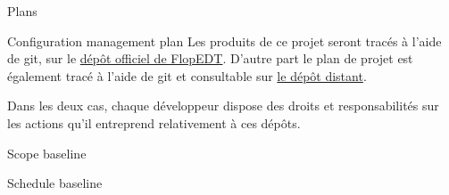 \documentclass[]{article}
\begin{document}
\begin{section}{Plans}
 \begin{subsection}{Configuration management plan}
     Les produits de ce projet seront tracés à l'aide de git, sur le \href{https://framagit.org/flopedt/FlOpEDT}{dépôt officiel de FlopEDT}.
     D'autre part le plan de projet est également tracé à l'aide de git et consultable sur \href{https://github.com/Szyckaa/UE-PROJET-DOCS-GESTION}{le dépôt distant}.

     Dans les deux cas, chaque développeur dispose des droits et responsabilités sur les actions qu'il entreprend relativement à ces dépôts.
 \end{subsection}

 \begin{subsection}{Scope baseline}

 \end{subsection}

 \begin{subsection}{Schedule baseline}

 \end{subsection}

\end{section}
\end{document}
